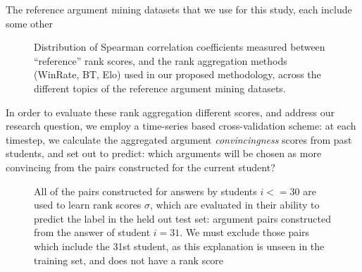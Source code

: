 \documentclass[notitlepage,12pt]{jedm}
\begin{document}
\begin{enumerate}
%	
%	
%	
%	
\end{enumerate}

The reference argument mining datasets that we use for this study, each include 
some other

\begin{figure}[H]
	\scalebox{0.7}{}
	\caption{Distribution of Spearman correlation  coefficients measured 
	between ``reference'' rank scores, and the rank aggregation methods 
	(WinRate, BT, Elo) used in our proposed methodology, across the different 
	topics of the reference argument mining datasets.}
	\label{fig:corr_to_reference_score}
\end{figure}

In order to evaluate these rank aggregation different scores, and address 
our research question, we employ a time-series based cross-validation scheme:
at each timestep, we calculate the aggregated argument \textit{convincingness} 
scores from past students, and set out to predict: which arguments will be 
chosen as more convincing from the pairs constructed for the current student?  



\begin{figure}
	\centering
	\def\svgscale{0.5}
	
	\caption{
		All of the pairs constructed for answers by students $i<=30$ are used 
		to learn rank scores $\sigma$, which are evaluated in their ability to 
		predict the label in the held out test set: argument pairs constructed 
		from the answer of student $i=31$.
		We must exclude those pairs which include the 31st student, as this 
		explanation is unseen in the training set, and does not have a rank 
		score 
	}
	\label{fig:make_pairs_time_series}
\end{figure}
\end{document}
